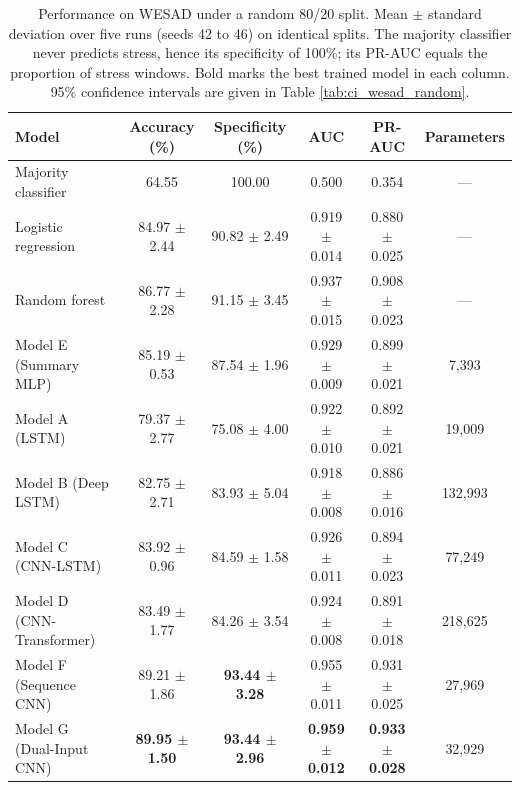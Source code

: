 \begin{table}[h!]
\centering
\small
\begin{tabular}{|l|c|c|c|c|c|}
\hline
\textbf{Model} & \textbf{Accuracy (\%)} & \textbf{Specificity (\%)} & \textbf{AUC} & \textbf{PR-AUC} & \textbf{Parameters} \\ \hline
Majority classifier & 64.55 & 100.00 & 0.500 & 0.354 & --- \\ \hline
Logistic regression & 84.97 $\pm$ 2.44 & 90.82 $\pm$ 2.49 & 0.919 $\pm$ 0.014 & 0.880 $\pm$ 0.025 & --- \\ \hline
Random forest & 86.77 $\pm$ 2.28 & 91.15 $\pm$ 3.45 & 0.937 $\pm$ 0.015 & 0.908 $\pm$ 0.023 & --- \\ \hline
Model E (Summary MLP) & 85.19 $\pm$ 0.53 & 87.54 $\pm$ 1.96 & 0.929 $\pm$ 0.009 & 0.899 $\pm$ 0.021 & 7,393 \\ \hline
Model A (LSTM) & 79.37 $\pm$ 2.77 & 75.08 $\pm$ 4.00 & 0.922 $\pm$ 0.010 & 0.892 $\pm$ 0.021 & 19,009 \\ \hline
Model B (Deep LSTM) & 82.75 $\pm$ 2.71 & 83.93 $\pm$ 5.04 & 0.918 $\pm$ 0.008 & 0.886 $\pm$ 0.016 & 132,993 \\ \hline
Model C (CNN-LSTM) & 83.92 $\pm$ 0.96 & 84.59 $\pm$ 1.58 & 0.926 $\pm$ 0.011 & 0.894 $\pm$ 0.023 & 77,249 \\ \hline
Model D (CNN-Transformer) & 83.49 $\pm$ 1.77 & 84.26 $\pm$ 3.54 & 0.924 $\pm$ 0.008 & 0.891 $\pm$ 0.018 & 218,625 \\ \hline
Model F (Sequence CNN) & 89.21 $\pm$ 1.86 & \textbf{93.44 $\pm$ 3.28} & 0.955 $\pm$ 0.011 & 0.931 $\pm$ 0.025 & 27,969 \\ \hline
Model G (Dual-Input CNN) & \textbf{89.95 $\pm$ 1.50} & \textbf{93.44 $\pm$ 2.96} & \textbf{0.959 $\pm$ 0.012} & \textbf{0.933 $\pm$ 0.028} & 32,929 \\ \hline
\end{tabular}
\caption{Performance on WESAD under a random 80/20 split. Mean $\pm$ standard deviation over five runs (seeds 42 to 46) on identical splits. The majority classifier never predicts stress, hence its specificity of 100\%; its PR-AUC equals the proportion of stress windows. Bold marks the best trained model in each column. 95\% confidence intervals are given in Table \ref{tab:ci_wesad_random}.}
\label{tab:wesad_random}
\end{table}

